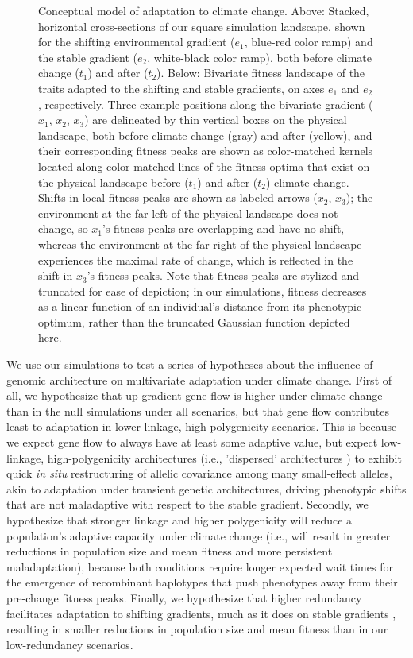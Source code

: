 \documentclass[9pt,twocolumn,twoside,lineno]{pnas-new}
\begin{document}
\begin{figure}
    \caption{Conceptual model of adaptation to climate change. Above: Stacked, horizontal cross-sections of our square simulation landscape, shown for the shifting environmental gradient ($e_{1}$, blue-red color ramp) and the stable gradient ($e_{2}$, white-black color ramp), both before climate change ($t_{1}$) and after ($t_{2}$). Below: Bivariate fitness landscape of the traits adapted to the shifting and stable gradients, on axes $e_{1}$ and $e_{2}$, respectively. Three example positions along the bivariate gradient ($x_{1}$, $x_{2}$, $x_{3}$) are delineated by thin vertical boxes on the physical landscape, both before climate change (gray) and after (yellow), and their corresponding fitness peaks are shown as color-matched kernels located along color-matched lines of the fitness optima that exist on the physical landscape before ($t_{1}$) and after ($t_{2}$) climate change. Shifts in local fitness peaks are shown as labeled arrows ($x_{2}$, $x_{3}$); the environment at the far left of the physical landscape does not change, so $x_{1}$'s fitness peaks are overlapping and have no shift, whereas the environment at the far right of the physical landscape experiences the maximal rate of change, which is reflected in the shift in $x_{3}$'s fitness peaks. Note that fitness peaks are stylized and truncated for ease of depiction; in our simulations, fitness decreases as a linear function of an individual's distance from its phenotypic optimum, rather than the truncated Gaussian function depicted here.}
\label{fig:fig_1}
\end{figure}


We use our simulations to test a series of hypotheses about the influence of genomic architecture 
on multivariate adaptation under climate change. First of all, we hypothesize that up-gradient 
gene flow is higher under climate change than in the null simulations under all 
scenarios, but that gene flow contributes least to adaptation in lower-linkage, 
high-polygenicity scenarios. This is because we expect gene flow to always have
at least some adaptive value, but expect low-linkage, high-polygenicity architectures 
(i.e., 'dispersed' architectures \cite{yeaman_review}) to exhibit quick \textit{in situ}
restructuring of allelic covariance among many small-effect alleles, akin to adaptation 
under transient genetic architectures, driving phenotypic shifts that are not maladaptive 
with respect to the stable gradient. Secondly, we hypothesize that stronger linkage 
and higher polygenicity will reduce a population's adaptive capacity under climate change
(i.e., will result in greater reductions in population size and mean fitness
and more persistent maladaptation), because both conditions require longer expected
wait times for the emergence of recombinant haplotypes that push phenotypes
away from their pre-change fitness peaks. Finally, we hypothesize that higher redundancy
facilitates adaptation to shifting gradients, much as it does on stable gradients 
\cite{barghi_redundancy,manceau,yeaman_amnat}, resulting in smaller reductions 
in population size and mean fitness than in our low-redundancy scenarios.
\end{document}
